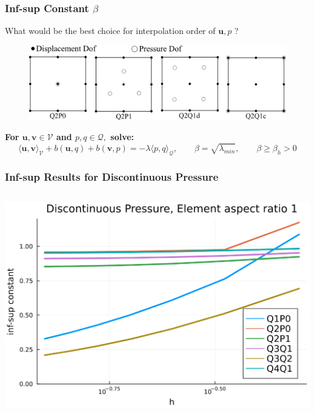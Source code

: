\documentclass[aspectratio=169,xcolor=dvipsnames]{beamer}
\newcommand{\bm}{\boldsymbol}
\begin{document}
\begin{frame}
\frametitle{Inf-sup Constant $\beta$}
What would be the best choice for interpolation order of $\bm{u}, p$ ?
\vspace*{20pt}

\begin{figure}
\centering
\includegraphics[width =1.5\textheight]{figures/mixed-element.png}
\end{figure}

\textbf{For $\bm{u}, \bm{v} \in \mathcal{V}$ and $p,q \in \mathcal{Q},$ solve:}
$$\langle\bm{u}, \bm{v} \rangle_{\mathcal{V}} + b(\bm{u},q) + b(\bm{v},p) = -\lambda \langle p, q \rangle_{\mathcal{Q}}, \qquad \beta = \sqrt{\lambda_{min}}, \qquad \beta \geq \beta_h >0 $$
        
\end{frame}


\begin{frame}
    \frametitle{Inf-sup Results for Discontinuous Pressure}
    \begin{columns}
        \centering
        \includegraphics[height =0.6\textheight]{figures/dist-p-1.png}
    \end{columns}

\end{frame}
\end{document}
